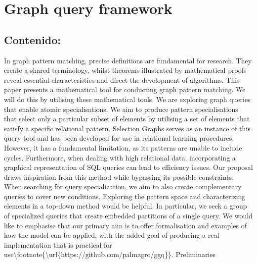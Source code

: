\documentclass{article}%
\begin{document}
%
\clearpage%
\section{Graph query framework}%
\label{sec:Graphqueryframework}%
\subsection{Contenido:}%
\label{subsec:Contenido}%
In graph pattern matching, precise definitions are fundamental for research. They create a shared terminology, whilst theorems illustrated by mathematical proofs reveal essential characteristics and direct the development of algorithms. This paper presents a mathematical tool for conducting graph pattern matching. We will do this by utilising these mathematical tools.\newline%
\newline%
We are exploring graph queries that enable atomic specialisations. We aim to produce pattern specialisations that select only a particular subset of elements by utilising a set of elements that satisfy a specific relational pattern. Selection Graphs serves as an instance of this query tool and has been developed for use in relational learning procedures. However, it has a fundamental limitation, as its patterns are unable to include cycles. Furthermore, when dealing with high relational data, incorporating a graphical representation of SQL queries can lead to efficiency issues. Our proposal draws inspiration from this method while bypassing its possible constraints.\newline%
\newline%
When searching for query specialization, we aim to also create complementary queries to cover new conditions. Exploring the pattern space and characterizing elements in a top{-}down method would be helpful. In particular, we seek a group of specialized queries that create embedded partitions of a single query.\newline%
\newline%
We would like to emphasise that our primary aim is to offer formalisation and examples of how the model can be applied, with the added goal of producing a real implementation that is practical for use\textbackslash{}footnote\{\textbackslash{}url\{https://github.com/palmagro/ggq\}\}.\newline%
\newline%
Preliminaries\newline%
\newline%
\end{document}
